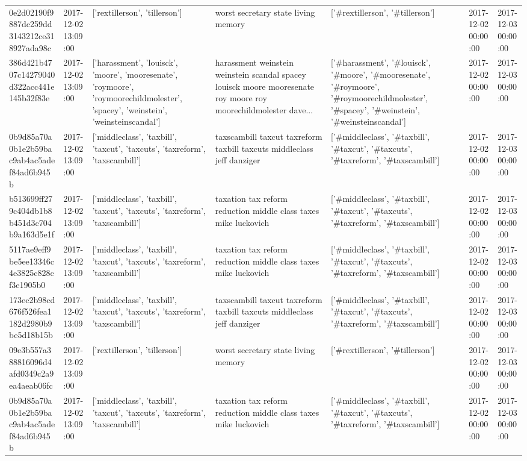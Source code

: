 \begin{tabular}{lllllll}
0e2d02190f9887dc259dd3143212ce318927ada98c & 2017-12-02 13:09:00 & ['rextillerson', 'tillerson'] & worst secretary state living memory & ['#rextillerson', '#tillerson'] & 2017-12-02 00:00:00 & 2017-12-03 00:00:00 \\
386d421b4707c14279040d322acc441e145b32f83e & 2017-12-02 13:09:00 & ['harassment', 'louisck', 'moore', 'mooresenate', 'roymoore', 'roymoorechildmolester', 'spacey', 'weinstein', 'weinsteinscandal'] & harassment weinstein weinstein scandal spacey louisck moore mooresenate roy moore roy moorechildmolester dave... & ['#harassment', '#louisck', '#moore', '#mooresenate', '#roymoore', '#roymoorechildmolester', '#spacey', '#weinstein', '#weinsteinscandal'] & 2017-12-02 00:00:00 & 2017-12-03 00:00:00 \\
0b9d85a70a0b1e2b59bac9ab4ac5adef84ad6b945b & 2017-12-02 13:09:00 & ['middleclass', 'taxbill', 'taxcut', 'taxcuts', 'taxreform', 'taxscambill'] & taxscambill taxcut taxreform taxbill taxcuts middleclass jeff danziger & ['#middleclass', '#taxbill', '#taxcut', '#taxcuts', '#taxreform', '#taxscambill'] & 2017-12-02 00:00:00 & 2017-12-03 00:00:00 \\
b513699ff279c404db1b8b451d3c704b9a163d5e1f & 2017-12-02 13:09:00 & ['middleclass', 'taxbill', 'taxcut', 'taxcuts', 'taxreform', 'taxscambill'] & taxation tax reform reduction middle class taxes mike luckovich & ['#middleclass', '#taxbill', '#taxcut', '#taxcuts', '#taxreform', '#taxscambill'] & 2017-12-02 00:00:00 & 2017-12-03 00:00:00 \\
5117ae9eff9be5ee13346c4e3825c828cf3e1905b0 & 2017-12-02 13:09:00 & ['middleclass', 'taxbill', 'taxcut', 'taxcuts', 'taxreform', 'taxscambill'] & taxation tax reform reduction middle class taxes mike luckovich & ['#middleclass', '#taxbill', '#taxcut', '#taxcuts', '#taxreform', '#taxscambill'] & 2017-12-02 00:00:00 & 2017-12-03 00:00:00 \\
173ec2b98cd676f526fea1182d2980b9be5d18b15b & 2017-12-02 13:09:00 & ['middleclass', 'taxbill', 'taxcut', 'taxcuts', 'taxreform', 'taxscambill'] & taxscambill taxcut taxreform taxbill taxcuts middleclass jeff danziger & ['#middleclass', '#taxbill', '#taxcut', '#taxcuts', '#taxreform', '#taxscambill'] & 2017-12-02 00:00:00 & 2017-12-03 00:00:00 \\
09e3b557a388816096d4afd0349c2a9ea4aeab06fc & 2017-12-02 13:09:00 & ['rextillerson', 'tillerson'] & worst secretary state living memory & ['#rextillerson', '#tillerson'] & 2017-12-02 00:00:00 & 2017-12-03 00:00:00 \\
0b9d85a70a0b1e2b59bac9ab4ac5adef84ad6b945b & 2017-12-02 13:09:00 & ['middleclass', 'taxbill', 'taxcut', 'taxcuts', 'taxreform', 'taxscambill'] & taxation tax reform reduction middle class taxes mike luckovich & ['#middleclass', '#taxbill', '#taxcut', '#taxcuts', '#taxreform', '#taxscambill'] & 2017-12-02 00:00:00 & 2017-12-03 00:00:00 \\

\end{tabular}
